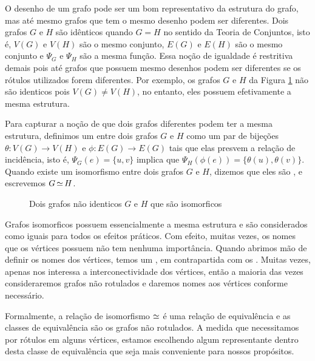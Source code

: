 O desenho de um grafo pode ser um bom representativo da estrutura do grafo, mas até mesmo grafos que tem o mesmo desenho podem ser diferentes. Dois grafos $G$ e $H$ são idênticos quando $G = H$ no sentido da Teoria de Conjuntos, isto é, $V(G)$ e $V(H)$ são o mesmo conjunto, $E(G)$ e $E(H)$ são o mesmo conjunto e $\Psi_G$ e $\Psi_H$ são a mesma função. Essa noção de igualdade é restritiva demais pois até grafos que possuem mesmo desenhos podem ser diferentes se os rótulos utilizados forem diferentes. Por exemplo, os grafos $G$ e $H$ da Figura \ref{fig:iso} não são identicos pois $V(G) \neq V(H)$, no entanto, eles possuem efetivamente a mesma estrutura.

Para capturar a noção de que dois grafos diferentes podem ter a mesma estrutura, definimos um  entre dois grafos $G$ e $H$ como um par de bijeções $\theta : V(G) \to V(H)$ e $\phi : E(G) \to E(G)$ tais que elas presvem a relação de incidência, isto é, $\Psi_G(e) = \{u,v\}$ implica que $\Psi_H(\phi(e)) = \{\theta(u),\theta(v)\}$. Quando existe um isomorfismo entre dois grafos $G$ e $H$, dizemos que eles são , e escrevemos $G \operatorname{\simeq} H$.

\begin{figure}[h!]
\centering
{}
\caption{Dois grafos não identicos $G$ e $H$ que são isomorficos}
\label{fig:iso}
\end{figure}

Grafos isomorficos possuem essencialmente a mesma estrutura e são considerados como iguais para todos os efeitos práticos. Com efeito, muitas vezes, os nomes que os vértices possuem não tem nenhuma importância. Quando abrimos mão de definir os nomes dos vértices, temos um , em contrapartida com os . Muitas vezes, apenas nos interessa a interconectividade dos vértices, então a maioria das vezes consideraremos grafos não rotulados e daremos nomes aos vértices conforme necessário.

Formalmente, a relação de isomorfismo $\operatorname{\simeq}$ é uma relação de equivalência e as classes de equivalência são os grafos não rotulados. A medida que necessitamos por rótulos em alguns vértices, estamos escolhendo algum representante dentro desta classe de equivalência que seja mais conveniente para nossos propósitos.

